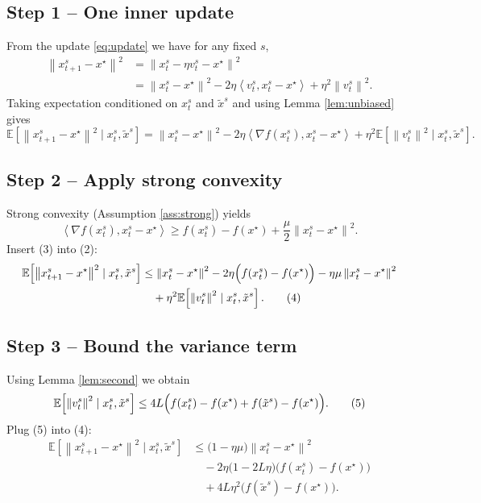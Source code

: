 \documentclass[11pt]{article}
\newcommand{\E}{\mathbb{E}}
\newcommand{\norm}[1]{\left\|#1\right\|}
\newcommand{\inner}[2]{\left\langle #1,#2\right\rangle}
\newcommand{\grad}{\nabla}
\begin{document}
\subsection*{Step 1 – One inner update}
From the update \eqref{eq:update} we have for any fixed $s$,
\[
\begin{aligned}
\norm{x_{t+1}^{s}-x^{\star}}^{2}
&=\norm{x_{t}^{s}-\eta v_t^{s}-x^{\star}}^{2}\\
&=\norm{x_{t}^{s}-x^{\star}}^{2}
   -2\eta\inner{v_t^{s}}{x_{t}^{s}-x^{\star}}
   +\eta^{2}\norm{v_t^{s}}^{2}. \tag{1}
\end{aligned}
\]
Taking expectation conditioned on $x_t^{s}$ and $\tilde{x}^{s}$ and using Lemma \ref{lem:unbiased} gives
\[
\E\!\left[\norm{x_{t+1}^{s}-x^{\star}}^{2}\mid x_t^{s},\tilde{x}^{s}\right]
= \norm{x_{t}^{s}-x^{\star}}^{2}
   -2\eta\inner{\grad f(x_t^{s})}{x_{t}^{s}-x^{\star}}
   +\eta^{2}\E\!\left[\norm{v_t^{s}}^{2}\mid x_t^{s},\tilde{x}^{s}\right]. \tag{2}
\]
\subsection*{Step 2 – Apply strong convexity}
Strong convexity (Assumption \ref{ass:strong}) yields
\[
\inner{\grad f(x_t^{s})}{x_{t}^{s}-x^{\star}}
\ge f(x_t^{s})-f(x^{\star})+\frac{\mu}{2}\norm{x_t^{s}-x^{\star}}^{2}. \tag{3}
\]
Insert (3) into (2):
\[
\begin{aligned}
\E\!\left[\norm{x_{t+1}^{s}-x^{\star}}^{2}\mid x_t^{s},\tilde{x}^{s}\right]
&\le \norm{x_{t}^{s}-x^{\star}}^{2}
   -2\eta\Bigl(f(x_t^{s})-f(x^{\star})\Bigr)
   -\eta\mu\norm{x_t^{s}-x^{\star}}^{2}\\
&\quad +\eta^{2}\E\!\left[\norm{v_t^{s}}^{2}\mid x_t^{s},\tilde{x}^{s}\right]. \tag{4}
\end{aligned}
\]
\subsection*{Step 3 – Bound the variance term}
Using Lemma \ref{lem:second} we obtain
\[
\E\!\left[\norm{v_t^{s}}^{2}\mid x_t^{s},\tilde{x}^{s}\right]
\le 4L\Bigl(f(x_t^{s})-f(x^{\star})+f(\tilde{x}^{s})-f(x^{\star})\Bigr). \tag{5}
\]
Plug (5) into (4):
\[
\begin{aligned}
\E\!\left[\norm{x_{t+1}^{s}-x^{\star}}^{2}\mid x_t^{s},\tilde{x}^{s}\right]
&\le \bigl(1-\eta\mu\bigr)\norm{x_{t}^{s}-x^{\star}}^{2}\\
&\quad -2\eta\bigl(1-2L\eta\bigr)\bigl(f(x_t^{s})-f(x^{\star})\bigr)\\
&\quad +4L\eta^{2}\bigl(f(\tilde{x}^{s})-f(x^{\star})\bigr). \tag{6}
\end{aligned}
\]
\end{document}
